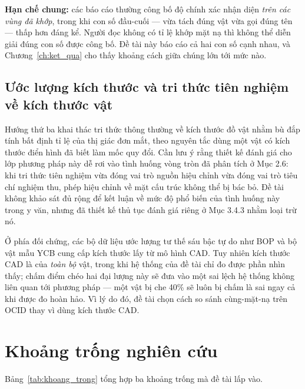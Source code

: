 \textbf{Hạn chế chung:} các báo cáo thường công bố độ chính xác nhận diện \emph{trên các vùng đã
khớp}, trong khi con số đầu-cuối --- vừa tách đúng vật vừa gọi đúng tên --- thấp hơn đáng kể.
Người đọc không có tỉ lệ khớp mặt nạ thì không thể diễn giải đúng con số được công bố. Đề tài
này báo cáo cả hai con số cạnh nhau, và Chương~\ref{ch:ket_qua} cho thấy khoảng cách giữa chúng
lớn tới mức nào.

\subsection{Ước lượng kích thước và tri thức tiên nghiệm về kích thước vật}

Hướng thứ ba khai thác tri thức thông thường về kích thước đồ vật nhằm bù đắp tính bất định tỉ lệ của thị giác đơn mắt, theo nguyên tắc dùng một vật có kích thước điển hình đã biết làm mốc quy đổi.
Cần lưu ý rằng thiết kế đánh giá cho lớp phương pháp này dễ rơi vào tình huống vòng tròn đã phân tích ở Mục 2.6: khi tri thức tiên nghiệm vừa đóng vai trò nguồn hiệu chỉnh vừa đóng vai trò tiêu chí nghiệm thu, phép hiệu chỉnh về mặt cấu trúc không thể bị bác bỏ. Đề tài không khảo sát đủ rộng để kết luận về mức độ phổ biến của tình huống này trong y văn, nhưng đã thiết kế thủ tục đánh giá riêng ở Mục 3.4.3 nhằm loại trừ nó.

Ở phía đối chứng, các bộ dữ liệu ước lượng tư thế sáu bậc tự do như BOP \cite{hodan2018bop} và
bộ vật mẫu YCB \cite{calli2015ycb} cung cấp kích thước lấy từ mô hình CAD. Tuy nhiên kích thước
CAD là của \emph{toàn bộ} vật, trong khi hệ thống của đề tài chỉ đo được phần nhìn thấy; chấm
điểm chéo hai đại lượng này sẽ đưa vào một sai lệch hệ thống không liên quan tới phương pháp ---
một vật bị che 40\% sẽ luôn bị chấm là sai ngay cả khi được đo hoàn hảo. Vì lý do đó, đề tài
chọn cách so sánh cùng-mặt-nạ trên OCID thay vì dùng kích thước CAD.

\section{Khoảng trống nghiên cứu}

Bảng~\ref{tab:khoang_trong} tổng hợp ba khoảng trống mà đề tài lấp vào.

